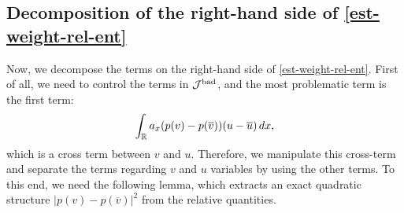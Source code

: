 \documentclass[11pt,reqno]{amsart}
\begin{document}
\subsection{Decomposition of the right-hand side of \eqref{est-weight-rel-ent}} 

Now, we decompose the terms on the right-hand side of \eqref{est-weight-rel-ent}. First of all, we need to control the terms in $\mathcal{J}^{\textup{bad}}$, and the most problematic term is the first term:
\[\int_{\mathbb{R}} a_x(p(v)-p(\overline{v}))(u-\overline{u})\,dx,\]
which is a cross term between $v$ and $u$. Therefore, we manipulate this cross-term and separate the terms regarding $v$ and $u$ variables by using the other terms. To this end, we need the following lemma, which extracts an exact quadratic structure $|p(v)-p(\overline{v})|^2$ from the relative quantities.
  
\end{document}
